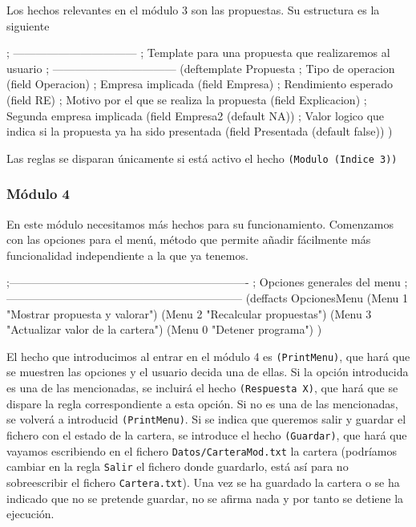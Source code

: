 \documentclass[11pt,leqno]{article}
\theoremstyle{definition_wo_parentheses}
\theoremstyle{plain}
\theoremstyle{remark}
\begin{document}
Los hechos relevantes en el módulo 3 son las propuestas. Su estructura es la siguiente

\begin{clips-code}

; ---------------------------------
; Template para una propuesta que realizaremos al usuario
; ---------------------------------
(deftemplate Propuesta
  ; Tipo de operacion
  (field Operacion)
  ; Empresa implicada
  (field Empresa)
  ; Rendimiento esperado
  (field RE)
  ; Motivo por el que se realiza la propuesta
  (field Explicacion)
  ; Segunda empresa implicada
  (field Empresa2
    (default NA))
  ; Valor logico que indica si la propuesta ya ha sido presentada
  (field Presentada
    (default false))
)
\end{clips-code}

	Las reglas se disparan únicamente si está activo el hecho \texttt{(Modulo (Indice 3))}
	
\subsubsection{Módulo 4}

En este módulo necesitamos más hechos para su funcionamiento. Comenzamos con las opciones para el menú, método que permite añadir fácilmente más funcionalidad independiente a la que ya tenemos. 

\begin{clips-code}
;----------------------------------------------------------------
; Opciones generales del menu
; ---------------------------------------------------------------
(deffacts OpcionesMenu
  (Menu 1 "Mostrar propuesta y valorar")
  (Menu 2 "Recalcular propuestas")
  (Menu 3 "Actualizar valor de la cartera")
  (Menu 0 "Detener programa")
  )
\end{clips-code}

El hecho que introducimos al entrar en el módulo 4 es \texttt{(PrintMenu)}, que hará que se muestren las opciones y el usuario decida una de ellas. Si la opción introducida es una de las mencionadas, se incluirá el hecho \texttt{(Respuesta X)}, que hará que se dispare la regla correspondiente a esta opción. Si no es una de las mencionadas, se volverá a introducid \texttt{(PrintMenu)}. Si se indica que queremos salir y guardar el fichero con el estado de la cartera, se introduce el hecho \texttt{(Guardar)}, que hará que vayamos escribiendo en el fichero \texttt{Datos/CarteraMod.txt} la cartera (podríamos cambiar en la regla \texttt{Salir} el fichero donde guardarlo, está así para no sobreescribir el fichero \texttt{Cartera.txt}). Una vez se ha guardado la cartera o se ha indicado que no se pretende guardar, no se afirma nada y por tanto se detiene la ejecución. \\
\end{document}
